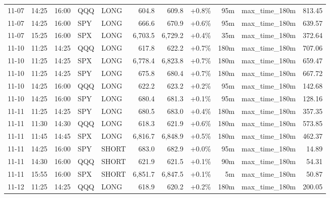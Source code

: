 \documentclass[11pt,a4paper,twoside]{article}
\begin{document}
\begin{center}
\begin{longtable}{>{\color{txtmain}}l l l l l r r r r >{\color{txtmain}}l r}
11-07 & 14:25 & 16:00 & QQQ & LONG & 604.8 & 609.8 & \textcolor{wingreen}{+0.8\%} & 95m & max\_time\_180m & \textcolor{wingreen}{813.45} \\
11-07 & 14:25 & 16:00 & SPY & LONG & 666.6 & 670.9 & \textcolor{wingreen}{+0.6\%} & 95m & max\_time\_180m & \textcolor{wingreen}{639.57} \\
11-07 & 15:25 & 16:00 & SPX & LONG & 6,703.5 & 6,729.2 & \textcolor{wingreen}{+0.4\%} & 35m & max\_time\_180m & \textcolor{wingreen}{372.64} \\
11-10 & 11:25 & 14:25 & QQQ & LONG & 617.8 & 622.2 & \textcolor{wingreen}{+0.7\%} & 180m & max\_time\_180m & \textcolor{wingreen}{707.06} \\
11-10 & 11:25 & 14:25 & SPX & LONG & 6,778.4 & 6,823.8 & \textcolor{wingreen}{+0.7\%} & 180m & max\_time\_180m & \textcolor{wingreen}{659.47} \\
11-10 & 11:25 & 14:25 & SPY & LONG & 675.8 & 680.4 & \textcolor{wingreen}{+0.7\%} & 180m & max\_time\_180m & \textcolor{wingreen}{667.72} \\
11-10 & 14:25 & 16:00 & QQQ & LONG & 622.2 & 623.2 & \textcolor{wingreen}{+0.2\%} & 95m & max\_time\_180m & \textcolor{wingreen}{142.68} \\
11-10 & 14:25 & 16:00 & SPY & LONG & 680.4 & 681.3 & \textcolor{wingreen}{+0.1\%} & 95m & max\_time\_180m & \textcolor{wingreen}{128.16} \\
11-11 & 11:25 & 14:25 & SPY & LONG & 680.5 & 683.0 & \textcolor{wingreen}{+0.4\%} & 180m & max\_time\_180m & \textcolor{wingreen}{357.35} \\
11-11 & 11:30 & 14:30 & QQQ & LONG & 618.3 & 621.9 & \textcolor{wingreen}{+0.6\%} & 180m & max\_time\_180m & \textcolor{wingreen}{573.85} \\
11-11 & 11:45 & 14:45 & SPX & LONG & 6,816.7 & 6,848.9 & \textcolor{wingreen}{+0.5\%} & 180m & max\_time\_180m & \textcolor{wingreen}{462.37} \\
11-11 & 14:25 & 16:00 & SPY & SHORT & 683.0 & 682.9 & \textcolor{wingreen}{+0.0\%} & 95m & max\_time\_180m & \textcolor{wingreen}{14.89} \\
11-11 & 14:30 & 16:00 & QQQ & SHORT & 621.9 & 621.5 & \textcolor{wingreen}{+0.1\%} & 90m & max\_time\_180m & \textcolor{wingreen}{54.31} \\
11-11 & 15:55 & 16:00 & SPX & SHORT & 6,851.7 & 6,847.5 & \textcolor{wingreen}{+0.1\%} & 5m & max\_time\_180m & \textcolor{wingreen}{50.87} \\
11-12 & 11:25 & 14:25 & QQQ & LONG & 618.9 & 620.2 & \textcolor{wingreen}{+0.2\%} & 180m & max\_time\_180m & \textcolor{wingreen}{200.05} \\

\end{longtable}
\end{center}
\end{document}
